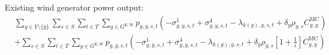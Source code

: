\documentclass{article}
\newcommand{\sGeneratorsExistingWind}{G^{\mathrm{E,W}}}
\newcommand{\sYears}{Y}
\newcommand{\sScenarios}{S}
\newcommand{\sIntervals}{T}
\newcommand{\iGenerator}{g}
\newcommand{\iYear}{y}
\newcommand{\iYearTerminal}{\overline{\iYear}}
\newcommand{\iScenario}{s}
\newcommand{\iInterval}{t}
\newcommand{\iIntervalTerminal}{\overline{\iInterval}}
\newcommand{\iZone}{z}
\newcommand{\cScenarioDuration}[1][\iYear,\iScenario]{\rho_{#1}}
\newcommand{\cMarginalCost}[1][\iGenerator,\iYear]{C^{\mathrm{MC}}_{#1}}
\newcommand{\cInterestRate}{i}
\newcommand{\cDiscountRate}[1][\iYear]{\delta_{#1}}
\newcommand{\vPower}[1][\iGenerator,\iYear,\iScenario,\iInterval]{p_{#1}}
\newcommand{\dMinPowerOutput}[1][\iGenerator,\iYear,\iScenario,\iInterval]{\sigma_{#1}^{1}}
\newcommand{\dMaxPowerOutputWindExisting}[1][\iGenerator,\iYear,\iScenario,\iInterval]{\sigma_{#1}^{4}}
\newcommand{\dRampRateUp}[1][\iGenerator,\iYear,\iScenario,\iInterval]{\sigma_{#1}^{20}}
\newcommand{\dRampRateDown}[1][\iGenerator,\iYear,\iScenario,\iInterval]{\sigma_{#1}^{23}}
\newcommand{\dPowerBalance}[1][\iZone,\iYear,\iScenario,\iInterval]{\lambda_{#1}}
\newcommand{\dGeneratorEnergyOutput}[1][\iGenerator,\iYear,\iScenario,\iInterval]{\zeta_{#1}^{2}}
\begin{document}
Existing wind generator power output:
\begin{align}
	& \sum\limits_{\iYear \in \sYears 
		\setminus \{\iYearTerminal\}
	}\sum\limits_{\iScenario \in \sScenarios}\sum\limits_{\iInterval \in \sIntervals} \sum\limits_{\iGenerator \in \sGeneratorsExistingWind} \vPower\left(-\dMinPowerOutput + \dMaxPowerOutputWindExisting
	- \dPowerBalance[k(\iGenerator),\iYear,\iScenario,\iInterval] + \cDiscountRate \cScenarioDuration\cMarginalCost
	\right)\nonumber\\
	& + \sum\limits_{\iScenario \in \sScenarios} \sum\limits_{\iInterval \in \sIntervals} \sum\limits_{\iGenerator \in \sGeneratorsExistingWind} \vPower[\iGenerator,\iYearTerminal,\iScenario,\iInterval] \left(-\dMinPowerOutput[\iGenerator,\iYearTerminal,\iScenario,\iInterval] + \dMaxPowerOutputWindExisting[\iGenerator,\iYearTerminal,\iScenario,\iInterval] - \dPowerBalance[k(\iGenerator),\iYearTerminal,\iScenario,\iInterval] + \cDiscountRate[\iYearTerminal] \cScenarioDuration[\iYearTerminal,\iScenario] \left[1 + \frac{1}{\cInterestRate}\right] \cMarginalCost \right)\\\nonumber
\end{align}
\end{document}
